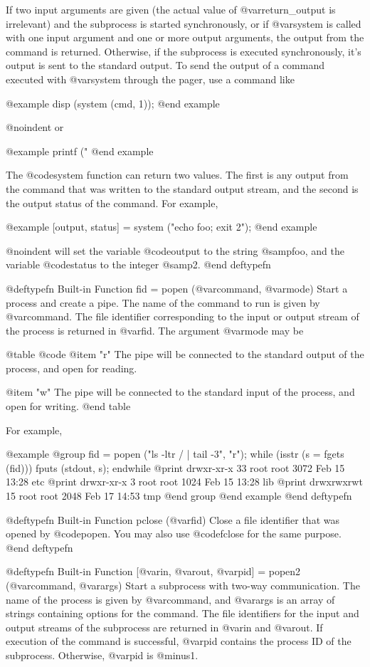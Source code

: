 {{If two input arguments are given (the actual value of
@var{return_output} is irrelevant) and the subprocess is started
synchronously, or if @var{system} is called with one input argument and
one or more output arguments, the output from the command is returned.
Otherwise, if the subprocess is executed synchronously, it's output is
sent to the standard output.  To send the output of a command executed
with @var{system} through the pager, use a command like

@example
disp (system (cmd, 1));
@end example

@noindent
or

@example
printf ("%
@end example

The @code{system} function can return two values.  The first is any
output from the command that was written to the standard output stream,
and the second is the output status of the command.  For example,

@example
[output, status] = system ("echo foo; exit 2");
@end example

@noindent
will set the variable @code{output} to the string @samp{foo}, and the
variable @code{status} to the integer @samp{2}.
@end deftypefn

@deftypefn {Built-in Function} {fid =} popen (@var{command}, @var{mode})
Start a process and create a pipe.  The name of the command to run is
given by @var{command}.  The file identifier corresponding to the input
or output stream of the process is returned in @var{fid}.  The argument
@var{mode} may be

@table @code
@item "r"
The pipe will be connected to the standard output of the process, and
open for reading.

@item "w"
The pipe will be connected to the standard input of the process, and
open for writing.
@end table

For example,

@example
@group
fid = popen ("ls -ltr / | tail -3", "r");
while (isstr (s = fgets (fid)))
  fputs (stdout, s);
endwhile
     @print{} drwxr-xr-x  33 root  root  3072 Feb 15 13:28 etc
     @print{} drwxr-xr-x   3 root  root  1024 Feb 15 13:28 lib
     @print{} drwxrwxrwt  15 root  root  2048 Feb 17 14:53 tmp
@end group
@end example
@end deftypefn

@deftypefn {Built-in Function} {} pclose (@var{fid})
Close a file identifier that was opened by @code{popen}.  You may also
use @code{fclose} for the same purpose.
@end deftypefn

@deftypefn {Built-in Function} {[@var{in}, @var{out}, @var{pid}] =} popen2 (@var{command}, @var{args})
Start a subprocess with two-way communication.  The name of the process
is given by @var{command}, and @var{args} is an array of strings
containing options for the command.  The file identifiers for the input
and output streams of the subprocess are returned in @var{in} and
@var{out}.  If execution of the command is successful, @var{pid}
contains the process ID of the subprocess.  Otherwise, @var{pid} is
@minus{}1.

}}
